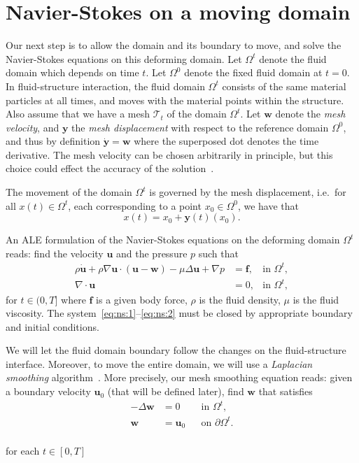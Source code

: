 \documentclass[11pt,a4paper,titlepage]{report}
\newcommand{\mesh}{\mathcal{T}_t}
\begin{document}
\section{Navier-Stokes on a moving domain}

Our next step is to allow the domain and its boundary to move, and
solve the Navier-Stokes equations on this deforming domain. Let
$\Omega^t$ denote the fluid domain which depends on time $t$. Let
$\Omega^0$ denote the fixed fluid domain at $t = 0$. In
fluid-structure interaction, the fluid domain $\Omega^t$ consists of
the same material particles at all times, and moves with the material
points within the structure. Also assume that we have a mesh $\mesh$
of the domain $\Omega^t$. Let $\mathbf{w}$ denote the \emph{mesh
  velocity}, and $\mathbf{y}$ the \emph{mesh displacement} with
respect to the reference domain $\Omega^0$, and thus by definition
$\dot{\mathbf{y}} = \mathbf{w}$ where the superposed dot denotes the
time derivative. The mesh velocity can be chosen arbitrarily in
principle, but this choice could effect the accuracy of the
solution~\cite{}.

The movement of the domain $\Omega^t$ is governed by the mesh
displacement, i.e.~for all $x(t) \in \Omega^t$, each corresponding to
a point $x_0 \in \Omega^0$, we have that
\begin{equation}
  x(t) = x_0 + \mathbf{y}(t)(x_0).
\end{equation}

An ALE formulation of the Navier-Stokes equations on the deforming
domain $\Omega^t$ reads: find the velocity $\mathbf{u}$ and the
pressure $p$ such that
\begin{align}
  \label{eq:ns:1}
  \rho \dot{\mathbf{u}}
  + \rho \nabla \mathbf{u} \cdot (\mathbf{u} - \mathbf{w})
  - \mu \Delta \mathbf{u} + \nabla p
  &= \mathbf{f},  & \text{in } \Omega^t, \\
  \label{eq:ns:2}
  \nabla \cdot \mathbf{u} &= 0, & \text{in } \Omega^t,
\end{align}
for $t \in (0, T]$ where $\mathbf{f}$ is a given body force, $\rho$ is
  the fluid density, $\mu$ is the fluid viscosity. The
  system~\eqref{eq:ns:1}--\eqref{eq:ns:2} must be closed by
  appropriate boundary and initial conditions.

We will let the fluid domain boundary follow the changes on the
fluid-structure interface. Moreover, to move the entire domain, we
will use a \emph{Laplacian smoothing}
algorithm~\cite{Winslow1963}. More precisely, our mesh smoothing
equation reads: given a boundary velocity $\mathbf{u}_0$ (that will be defined later), find
$\mathbf{w}$ that satisfies
\begin{align}
\label{eq:bc:2}
- \Delta \mathbf{w} &= 0 	&& \text{in } \Omega^t, \\
\mathbf{w} &= \mathbf{u}_0 && \text{on } \partial \Omega^t .
\end{align}
\\
for each $t \in [0, T]$
\end{document}
